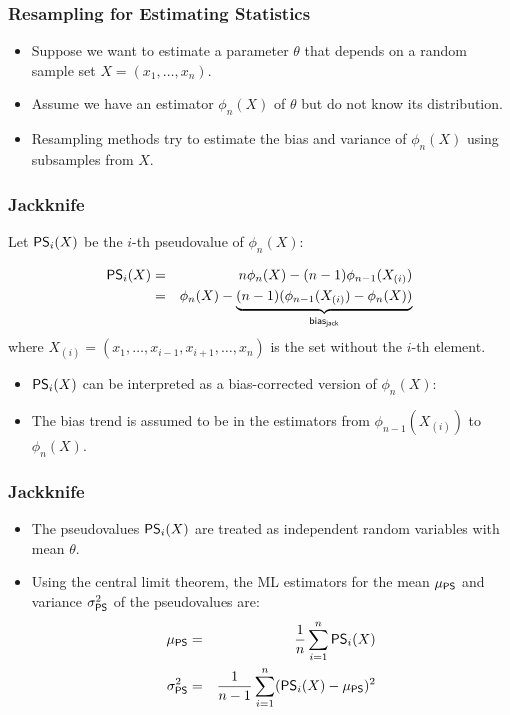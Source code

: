 \begin{frame}
  \frametitle{Resampling for Estimating Statistics \cont}

  
  \begin{itemize}
    \item Suppose we want to estimate a parameter $\theta$ that depends on a random sample set $X = (x_1, \ldots, x_n)$.
    \item Assume we have an estimator $\phi_n(X)$ of $\theta$ but do not know its distribution.
  \end{itemize}
  \pspread

  \begin{itemize}
    \item Resampling methods try to estimate the bias and variance of $\phi_n(X)$ using subsamples from $X$.
  \end{itemize}
\end{frame}


\begin{frame}
  \frametitle{Jackknife}
  
  Let ${\mathop{\mathsf{PS}}}_i(X)$ be the $i$-th pseudovalue of $\phi_n(X)$:

  \begin{eqnarray*}
    {\mathop{\mathsf{PS}}}_i(X) 
      &=& n \phi_n(X) - (n-1) \phi_{n-1}(X_{(i)}) \\
      &=& \phi_n(X) - \underbrace{(n-1)( \phi_{n-1}(X_{(i)}) - \phi_n(X))}_{\mathsf{bias}_{\mathsf{jack}}}
  \end{eqnarray*}
  where $X_{(i)} = (x_1, \ldots, x_{i-1}, x_{i+1}, \ldots, x_n)$ is the set without the $i$-th element.
  \pspread

  
  \begin{itemize}
    \item ${\mathop{\mathsf{PS}}}_i(X)$ can be interpreted as a bias-corrected version of $\phi_n(X)$: \pause
    \item The bias trend is assumed to be in the estimators from $\phi_{n-1}(X_{(i)})$ to $\phi_n(X)$.
  \end{itemize}
\end{frame}


\begin{frame}
  \frametitle{Jackknife \cont}


  \begin{itemize}
    \item The pseudovalues ${\mathop{\mathsf{PS}}}_i(X)$ are treated as independent random variables with mean $\theta$. \pause
    \item Using the central limit theorem, the ML estimators for the mean $\mu_{{\mathop{\mathsf{PS}}}}$ and variance $\sigma_{{\mathop{\mathsf{PS}}}}^2$ of the pseudovalues are:
      \begin{eqnarray*}
        \mu_{{\mathop{\mathsf{PS}}}}      &=& \frac{1}{n} \sum_{i=1}^n {\mathop{\mathsf{PS}}}_i(X) \\
        \sigma_{{\mathop{\mathsf{PS}}}}^2 &=& \frac{1}{n-1} \sum_{i=1}^n ({\mathop{\mathsf{PS}}}_i(X) - \mu_{{\mathop{\mathsf{PS}}}})^2
      \end{eqnarray*}
  \end{itemize}
\end{frame}


